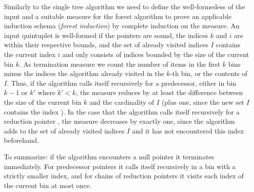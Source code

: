 \begin{isabellebody}
\isadelimdocument
%
\endisadelimdocument
%
\isatagdocument
%
\isamarkuptrue%
%
\endisatagdocument
{\isafolddocument}%
%
\isadelimdocument
%
\endisadelimdocument
%
\begin{isamarkuptext}%
Similarly to the single tree algorithm we need to define the well-formedess of the input and a suitable
measure for the forest algorithm to prove an applicable induction schema (\textit{forest induction}) by
complete induction on the measure. An input quintuplet  is well-formed if
the pointers are sound, the indices $k$ and $i$ are within their respective bounds, and the set of already
visited indices $I$ contains the current index $i$ and only consists of indices bounded by the size of the current bin $k$.
As termination measure we count the number of items in the first $k$ bins minus the indices the algorithm
already visited in the $k$-th bin, or the contents of $I$. Thus, if the algorithm calls itself recursively
for a predecessor, either in bin $k-1$ or $k'$ where $k' < k$, the measure reduces by at least the difference
between the size of the current bin $k$ and the cardinality of $I$ (plus one, since the new set $I$ contains the index ).
In the case that the algorithm calls itself recursively for a reduction pointer , the measure decreases by exactly
one, since the algorithm adds  to the set of already visited indices $I$ and it has not encountered this index beforehand.

To summarize: if the algorithm encounters a null pointer it terminates immediately.
For predecessor pointers it calls itself recursively in a bin with a strictly smaller index, and for chains of reduction
pointers it visits each index of the current bin at most once.


\end{isamarkuptext}
\end{isabellebody}
